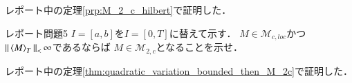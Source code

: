 \begin{prf}
	レポート中の定理\ref{prp:M_2_c_hilbert}で証明した．
	\QED
\end{prf}

\newpage
\begin{itembox}[l]{レポート問題5}
	$I = [a,b]$を$I = [0,T]$に替えて示す．
	$M \in \mathcal{M}_{c,loc}$かつ$\Norm{\inprod<M>_T} < \infty$であるならば
	$M \in \mathcal{M}_{2,c}$となることを示せ．
\end{itembox}

\begin{prf}
	レポート中の定理\ref{thm:quadratic_variation_bounded_then_M_2c}で証明した．
	\QED
\end{prf}

\newpage